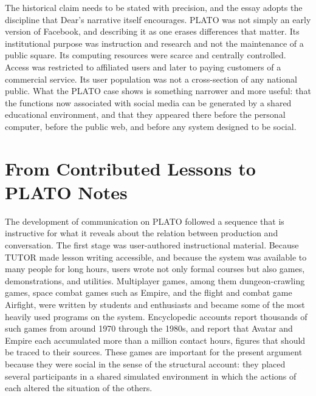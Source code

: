 \documentclass[11pt]{article}
\theoremstyle{remark}
\begin{document}
The historical claim needs to be stated with precision, and the essay adopts the discipline that Dear's narrative itself encourages. PLATO was not simply an early version of Facebook, and describing it as one erases differences that matter. Its institutional purpose was instruction and research and not the maintenance of a public square. Its computing resources were scarce and centrally controlled. Access was restricted to affiliated users and later to paying customers of a commercial service. Its user population was not a cross-section of any national public. What the PLATO case shows is something narrower and more useful: that the functions now associated with social media can be generated by a shared educational environment, and that they appeared there before the personal computer, before the public web, and before any system designed to be social.

\section{From Contributed Lessons to PLATO Notes}

The development of communication on PLATO followed a sequence that is instructive for what it reveals about the relation between production and conversation. The first stage was user-authored instructional material. Because TUTOR made lesson writing accessible, and because the system was available to many people for long hours, users wrote not only formal courses but also games, demonstrations, and utilities. Multiplayer games, among them dungeon-crawling games, space combat games such as Empire, and the flight and combat game Airfight, were written by students and enthusiasts and became some of the most heavily used programs on the system. Encyclopedic accounts report thousands of such games from around 1970 through the 1980s, and report that Avatar and Empire each accumulated more than a million contact hours, figures that should be traced to their sources. These games are important for the present argument because they were social in the sense of the structural account: they placed several participants in a shared simulated environment in which the actions of each altered the situation of the others.
\end{document}

